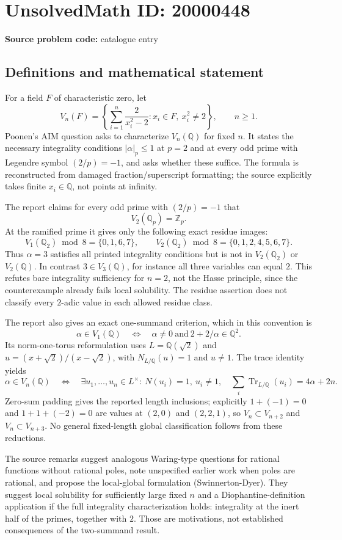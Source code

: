 \documentclass[11pt]{article}
\newcommand{\Z}{\mathbb{Z}}
\newcommand{\Q}{\mathbb{Q}}
\begin{document}
\section*{UnsolvedMath ID: 20000448}
\textbf{Source problem code:} catalogue entry
\subsection{Definitions and mathematical statement}
For a field $F$ of characteristic zero, let
\[
 V_n(F)=\left\{\sum_{i=1}^n\frac{2}{x_i^2-2}:x_i\in F,\ x_i^2\ne2\right\},\qquad n\geq1.
\]
Poonen's AIM question asks to characterize $V_n(\Q)$ for fixed $n$. It states the necessary integrality conditions $|\alpha|_p\leq1$ at $p=2$ and at every odd prime with Legendre symbol $(2/p)=-1$, and asks whether these suffice. The formula is reconstructed from damaged fraction/superscript formatting; the source explicitly takes finite $x_i\in\Q$, not points at infinity.

The report claims for every odd prime with $(2/p)=-1$ that
\[
 V_2(\Q_p)=\Z_p.
\]
At the ramified prime it gives only the following exact residue images:
\[
 V_1(\Q_2)\bmod8=\{0,1,6,7\},\qquad
 V_2(\Q_2)\bmod8=\{0,1,2,4,5,6,7\}.
\]
Thus $\alpha=3$ satisfies all printed integrality conditions but is not in $V_2(\Q_2)$ or $V_2(\Q)$. In contrast $3\in V_3(\Q)$, for instance all three variables can equal $2$. This refutes bare integrality sufficiency for $n=2$, not the Hasse principle, since the counterexample already fails local solubility. The residue assertion does not classify every $2$-adic value in each allowed residue class.

The report also gives an exact one-summand criterion, which in this convention is
\[
 \alpha\in V_1(\Q)\quad\Longleftrightarrow\quad
 \alpha\ne0\ \text{and}\ 2+2/\alpha\in\Q^2.
\]
Its norm-one-torus reformulation uses $L=\Q(\sqrt2)$ and $u=(x+\sqrt2)/(x-\sqrt2)$, with $N_{L/\Q}(u)=1$ and $u\ne1$. The trace identity yields
\[
 \alpha\in V_n(\Q)\quad\Longleftrightarrow\quad
 \exists u_1,\ldots,u_n\in L^\times:\ N(u_i)=1,\ u_i\ne1,
 \quad\sum_i\operatorname{Tr}_{L/\Q}(u_i)=4\alpha+2n.
\]
Zero-sum padding gives the reported length inclusions; explicitly $1+(-1)=0$ and $1+1+(-2)=0$ are values at $(2,0)$ and $(2,2,1)$, so $V_n\subset V_{n+2}$ and $V_n\subset V_{n+3}$. No general fixed-length global classification follows from these reductions.

The source remarks suggest analogous Waring-type questions for rational functions without rational poles, note unspecified earlier work when poles are rational, and propose the local-global formulation (Swinnerton-Dyer). They suggest local solubility for sufficiently large fixed $n$ and a Diophantine-definition application if the full integrality characterization holds: integrality at the inert half of the primes, together with $2$. Those are motivations, not established consequences of the two-summand result.
\end{document}
